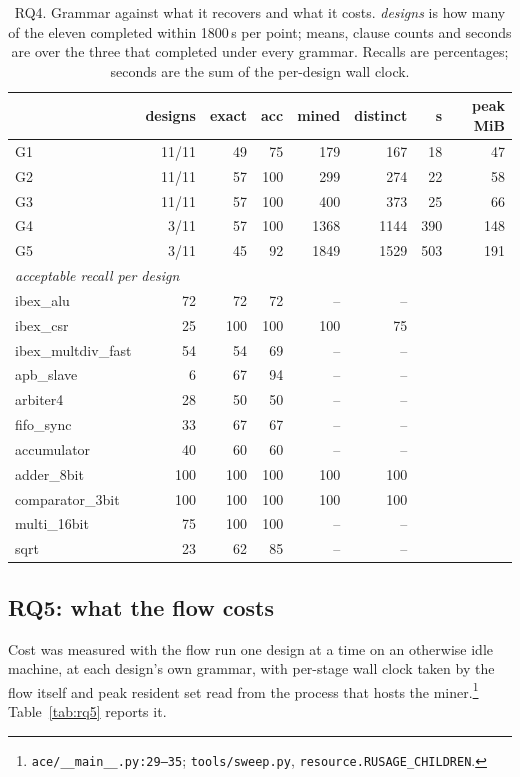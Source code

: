 \begin{table}[t]
\centering
\caption{RQ4. Grammar against what it recovers and what it costs. \emph{designs} is how many
of the eleven completed within 1800\,s per point; means, clause counts and seconds are over
the three that completed under every grammar. Recalls are percentages; seconds are the sum of
the per-design wall clock.}
\label{tab:rq4}
\begin{tabular}{lrrrrrrr}
\toprule
& designs & exact & acc & mined & distinct & s & peak MiB \\
\midrule
G1 & 11/11 & 49 & 75 & 179 & 167 & 18 & 47 \\
G2 & 11/11 & 57 & 100 & 299 & 274 & 22 & 58 \\
G3 & 11/11 & 57 & 100 & 400 & 373 & 25 & 66 \\
G4 & 3/11 & 57 & 100 & 1368 & 1144 & 390 & 148 \\
G5 & 3/11 & 45 & 92 & 1849 & 1529 & 503 & 191 \\
\midrule
\multicolumn{8}{l}{\emph{acceptable recall per design}} \\
ibex\_alu & 72 & 72 & 72 & -- & -- & & \\
ibex\_csr & 25 & 100 & 100 & 100 & 75 & & \\
ibex\_multdiv\_fast & 54 & 54 & 69 & -- & -- & & \\
apb\_slave & 6 & 67 & 94 & -- & -- & & \\
arbiter4 & 28 & 50 & 50 & -- & -- & & \\
fifo\_sync & 33 & 67 & 67 & -- & -- & & \\
accumulator & 40 & 60 & 60 & -- & -- & & \\
adder\_8bit & 100 & 100 & 100 & 100 & 100 & & \\
comparator\_3bit & 100 & 100 & 100 & 100 & 100 & & \\
multi\_16bit & 75 & 100 & 100 & -- & -- & & \\
sqrt & 23 & 62 & 85 & -- & -- & & \\
\bottomrule
\end{tabular}
\end{table}

\subsection{RQ5: what the flow costs}
\label{sec:rq5}
Cost was measured with the flow run one design at a time on an otherwise idle machine, at
each design's own grammar, with per-stage wall clock taken by the flow itself and peak
resident set read from the process that hosts the miner.\footnote{\texttt{ace/\_\_main\_\_.py:29--35};
\texttt{tools/sweep.py}, \texttt{resource.RUSAGE\_CHILDREN}.} Table~\ref{tab:rq5} reports it.

